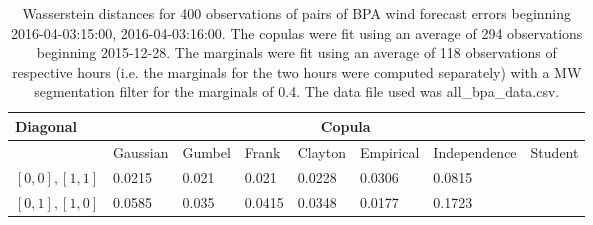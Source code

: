 \begin{table}[h] 
    \centering 
    \begin{tabular}{|l|l|l|l|l|l|l|l|} \hline 
        \textbf{Diagonal} & \multicolumn{7}{c|}{\textbf{Copula}} \\ \hline 
        & Gaussian & Gumbel & Frank & Clayton & Empirical & Independence & Student \\ \hline 
        $[0,0], [1,1]$ & 0.0215 & 0.021 & 0.021 & 0.0228 & 0.0306 & 0.0815 &  \\ \hline 
        $[0,1], [1,0]$ & 0.0585 & 0.035 & 0.0415 & 0.0348 & 0.0177 & 0.1723 &  \\ \hline 
    \end{tabular} 
    \caption{Wasserstein distances for 400 observations of pairs of BPA wind forecast errors beginning 2016-04-03:15:00, 2016-04-03:16:00. The copulas were fit  using an average of 294 observations beginning 2015-12-28. The marginals were fit using an average of 118 observations of respective hours (i.e. the  marginals for the two hours were computed separately) with a MW segmentation filter for the marginals of 0.4. The data file used was all\_bpa\_data.csv.} 
\end{table}